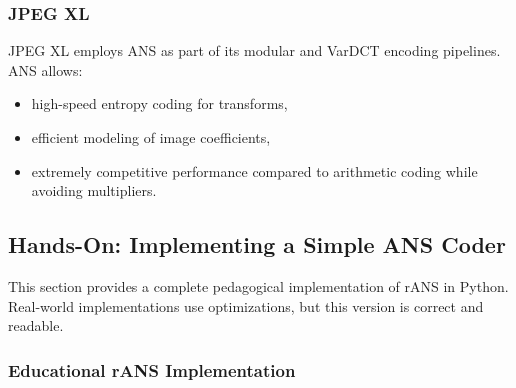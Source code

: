 \subsubsection{JPEG XL}

JPEG XL employs ANS as part of its modular and VarDCT encoding pipelines.  
ANS allows:

\begin{itemize}
    \item high-speed entropy coding for transforms,
    \item efficient modeling of image coefficients,
    \item extremely competitive performance compared to arithmetic coding while avoiding multipliers.
\end{itemize}

\subsection{Hands-On: Implementing a Simple ANS Coder}

This section provides a complete pedagogical implementation of rANS in Python.  
Real-world implementations use optimizations, but this version is correct and readable.

\subsubsection{Educational rANS Implementation}

